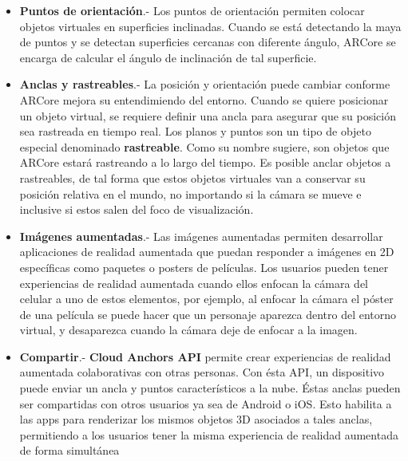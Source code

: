 \begin{itemize}
	\item \textbf{Puntos de orientación}.- Los puntos de orientación permiten colocar objetos virtuales en superficies inclinadas. Cuando se está detectando la maya de puntos y se detectan superficies cercanas con diferente ángulo, ARCore se encarga de calcular el ángulo de inclinación de tal superficie.
	
	\item \textbf{Anclas y rastreables}.- La posición y orientación puede cambiar conforme ARCore mejora su entendimiendo del entorno. Cuando se quiere posicionar un objeto virtual, se requiere definir una ancla para asegurar que su posición sea rastreada en tiempo real. Los planos y puntos son un tipo de objeto especial denominado \textbf{rastreable}. Como su nombre sugiere, son objetos que ARCore estará rastreando a lo largo del tiempo. Es posible anclar objetos a rastreables, de tal forma que estos objetos virtuales van a conservar su posición relativa en el mundo, no importando si la cámara se mueve e inclusive si estos salen del foco de visualización.
	
	\item \textbf{Imágenes aumentadas}.- Las imágenes aumentadas permiten desarrollar aplicaciones de realidad aumentada que puedan responder a imágenes en 2D específicas como paquetes o posters de películas. Los usuarios pueden tener experiencias de realidad aumentada cuando ellos enfocan la cámara del celular a uno de estos elementos, por ejemplo, al enfocar la cámara el póster de una película se puede hacer que un personaje aparezca dentro del entorno virtual, y desaparezca cuando la cámara deje de enfocar a la imagen.
	
	\item \textbf{Compartir}.- \textbf{Cloud Anchors API} permite crear experiencias de realidad aumentada colaborativas con otras personas. Con ésta API, un dispositivo puede enviar un ancla y puntos característicos a la nube. Éstas anclas pueden ser compartidas con otros usuarios ya sea de Android o iOS. Esto habilita a las apps para renderizar los mismos objetos 3D asociados a tales anclas, permitiendo a los usuarios tener la misma experiencia de realidad aumentada de forma simultánea
	
\end{itemize}

